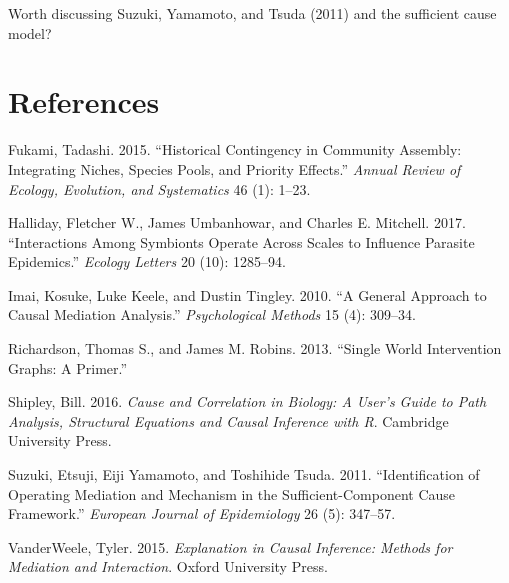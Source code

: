 \documentclass[]{article}
\begin{document}
Worth discussing Suzuki, Yamamoto, and Tsuda (2011) and the sufficient
cause model?

\hypertarget{references}{%
\section*{References}\label{references}}

\hypertarget{refs}{}
\leavevmode\hypertarget{ref-fukami2015historical}{}%
Fukami, Tadashi. 2015. ``Historical Contingency in Community Assembly:
Integrating Niches, Species Pools, and Priority Effects.'' \emph{Annual
Review of Ecology, Evolution, and Systematics} 46 (1): 1--23.

\leavevmode\hypertarget{ref-halliday2017interactions}{}%
Halliday, Fletcher W., James Umbanhowar, and Charles E. Mitchell. 2017.
``Interactions Among Symbionts Operate Across Scales to Influence
Parasite Epidemics.'' \emph{Ecology Letters} 20 (10): 1285--94.

\leavevmode\hypertarget{ref-imai2010general}{}%
Imai, Kosuke, Luke Keele, and Dustin Tingley. 2010. ``A General Approach
to Causal Mediation Analysis.'' \emph{Psychological Methods} 15 (4):
309--34.

\leavevmode\hypertarget{ref-richardson2013primer}{}%
Richardson, Thomas S., and James M. Robins. 2013. ``Single World
Intervention Graphs: A Primer.''

\leavevmode\hypertarget{ref-shipley2016cause}{}%
Shipley, Bill. 2016. \emph{Cause and Correlation in Biology: A User's
Guide to Path Analysis, Structural Equations and Causal Inference with
R}. Cambridge University Press.

\leavevmode\hypertarget{ref-suzuki2011identification}{}%
Suzuki, Etsuji, Eiji Yamamoto, and Toshihide Tsuda. 2011.
``Identification of Operating Mediation and Mechanism in the
Sufficient-Component Cause Framework.'' \emph{European Journal of
Epidemiology} 26 (5): 347--57.

\leavevmode\hypertarget{ref-vanderweele2015explanation}{}%
VanderWeele, Tyler. 2015. \emph{Explanation in Causal Inference: Methods
for Mediation and Interaction}. Oxford University Press.
\end{document}
